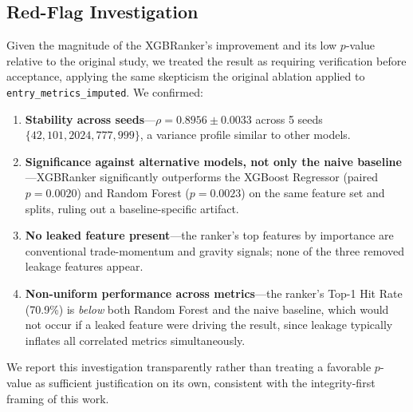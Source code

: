 \documentclass[conference]{IEEEtran}
\begin{document}
\subsection{Red-Flag Investigation}
Given the magnitude of the XGBRanker's improvement and its low $p$-value
relative to the original study, we treated the result as requiring
verification before acceptance, applying the same skepticism the original
ablation applied to \texttt{entry\_metrics\_imputed}. We confirmed:
\begin{enumerate}
\item \textbf{Stability across seeds}---$\rho = 0.8956 \pm 0.0033$ across 5
seeds $\{42,101,2024,777,999\}$, a variance profile similar to other
models.
\item \textbf{Significance against alternative models, not only the naive
baseline}---XGBRanker significantly outperforms the XGBoost Regressor
(paired $p=0.0020$) and Random Forest ($p=0.0023$) on the same feature set
and splits, ruling out a baseline-specific artifact.
\item \textbf{No leaked feature present}---the ranker's top features by
importance are conventional trade-momentum and gravity signals; none of
the three removed leakage features appear.
\item \textbf{Non-uniform performance across metrics}---the ranker's Top-1
Hit Rate (70.9\%) is \emph{below} both Random Forest and the naive
baseline, which would not occur if a leaked feature were driving the
result, since leakage typically inflates all correlated metrics
simultaneously.
\end{enumerate}
We report this investigation transparently rather than treating a favorable
$p$-value as sufficient justification on its own, consistent with the
integrity-first framing of this work.
\end{document}
